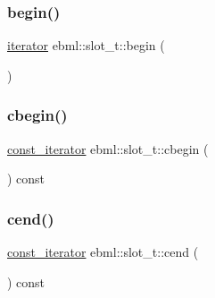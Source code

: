 \mbox{\label{classebml_1_1slot__t_a590850d87ced3306465a19fa1c84bd47}} 
\subsubsection{\texorpdfstring{begin()}{begin()}}
{\footnotesize\ttfamily \mbox{\hyperlink{classebml_1_1slot__t_1_1iterator}{iterator}} ebml\+::slot\+\_\+t\+::begin (\begin{DoxyParamCaption}{ }\end{DoxyParamCaption})}

\mbox{\label{classebml_1_1slot__t_a36172913879365e6df9b9deabdad96e3}} 
\subsubsection{\texorpdfstring{cbegin()}{cbegin()}}
{\footnotesize\ttfamily \mbox{\hyperlink{classebml_1_1slot__t_a035ab426d9062fc23e67d2b89f67ee84}{const\+\_\+iterator}} ebml\+::slot\+\_\+t\+::cbegin (\begin{DoxyParamCaption}{ }\end{DoxyParamCaption}) const}

\mbox{\label{classebml_1_1slot__t_a4e6943c40ac9c311ce2a2b2c8284919c}} 
\subsubsection{\texorpdfstring{cend()}{cend()}}
{\footnotesize\ttfamily \mbox{\hyperlink{classebml_1_1slot__t_a035ab426d9062fc23e67d2b89f67ee84}{const\+\_\+iterator}} ebml\+::slot\+\_\+t\+::cend (\begin{DoxyParamCaption}{ }\end{DoxyParamCaption}) const}

\mbox{\label{classebml_1_1slot__t_a47204fa4e7da5f36c97aeb36de78751d}} 

